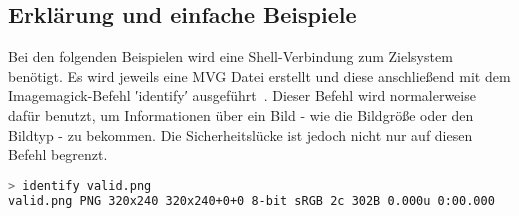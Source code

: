 \subsection{Erklärung und einfache Beispiele}\label{subsec:erklaerung-und-einfache-beispiele}

Bei den folgenden Beispielen wird eine Shell-Verbindung zum Zielsystem benötigt.
Es wird jeweils eine MVG Datei erstellt und diese anschließend mit dem Imagemagick-Befehl ′identify′ ausgeführt~\cite{PHPImagickIdentifyImage}.
Dieser Befehl wird normalerweise dafür benutzt,
um Informationen über ein Bild - wie die Bildgröße oder den Bildtyp - zu bekommen.
Die Sicherheitslücke ist jedoch nicht nur auf diesen Befehl begrenzt.\\

\begin{lstlisting}[language=Bash, caption=Erklaerung - Identify einer validen PNG Datei,label={lst:lstlisting}]
> identify valid.png
valid.png PNG 320x240 320x240+0+0 8-bit sRGB 2c 302B 0.000u 0:00.000
\end{lstlisting}

